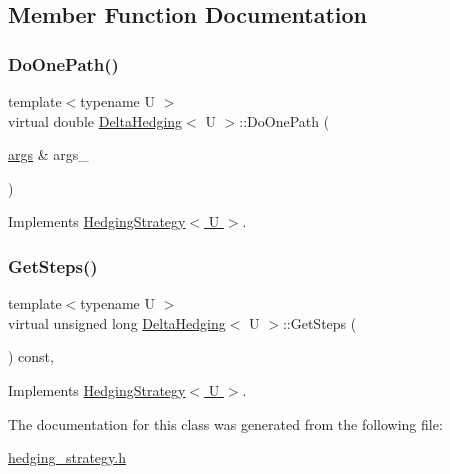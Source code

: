 \subsection{Member Function Documentation}
\hypertarget{classDeltaHedging_a670264651c7c2a3ce404bca291d2194f}{}\label{classDeltaHedging_a670264651c7c2a3ce404bca291d2194f} 
\subsubsection{\texorpdfstring{Do\+One\+Path()}{DoOnePath()}}
{\footnotesize\ttfamily template$<$typename U $>$ \\
virtual double \hyperlink{classDeltaHedging}{Delta\+Hedging}$<$ U $>$\+::Do\+One\+Path (\begin{DoxyParamCaption}\item[{\hyperlink{path__generation_8h_a75c13cde2074f502cc4348c70528572d}{args} \&}]{args\+\_\+ }\end{DoxyParamCaption})\hspace{0.3cm}{\ttfamily [virtual]}}



Implements \hyperlink{classHedgingStrategy_ad2a7c02ee59750c40f29a03ee6fee140}{Hedging\+Strategy$<$ U $>$}.

\hypertarget{classDeltaHedging_a0a6d6d2f73dfcf3425927cc45a012a2a}{}\label{classDeltaHedging_a0a6d6d2f73dfcf3425927cc45a012a2a} 
\subsubsection{\texorpdfstring{Get\+Steps()}{GetSteps()}}
{\footnotesize\ttfamily template$<$typename U $>$ \\
virtual unsigned long \hyperlink{classDeltaHedging}{Delta\+Hedging}$<$ U $>$\+::Get\+Steps (\begin{DoxyParamCaption}{ }\end{DoxyParamCaption}) const\hspace{0.3cm}{\ttfamily [inline]}, {\ttfamily [virtual]}}



Implements \hyperlink{classHedgingStrategy_a4df1155158f019fb0c4f565045b9e633}{Hedging\+Strategy$<$ U $>$}.



The documentation for this class was generated from the following file\+:\begin{DoxyCompactItemize}
\item 
\hyperlink{hedging__strategy_8h}{hedging\+\_\+strategy.\+h}\end{DoxyCompactItemize}

